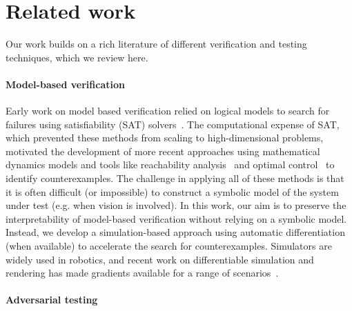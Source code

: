 \section{Related work}

Our work builds on a rich literature of different verification and testing techniques, which we review here.

\paragraph{Model-based verification}

Early work on model based verification relied on logical models to search for failures using satisfiability (SAT) solvers~\cite{dekleerDiagnosingMultipleFaults1987,benardRemoteAgentExperiment2000}. The computational expense of SAT, which prevented these methods from scaling to high-dimensional problems, motivated the development of more recent approaches using mathematical dynamics models and tools like reachability analysis~\cite{annpureddySTaLiRoToolTemporal2011} and optimal control~\cite{chouUsingControlSynthesis2018} to identify counterexamples. The challenge in applying all of these methods is that it is often difficult (or impossible) to construct a symbolic model of the system under test (e.g. when vision is involved). In this work, our aim is to preserve the interpretability of model-based verification without relying on a symbolic model. Instead, we develop a simulation-based approach using automatic differentiation (when available) to accelerate the search for counterexamples. Simulators are widely used in robotics, and recent work on differentiable simulation and rendering has made gradients available for a range of scenarios~\cite{amosOptNetDifferentiableOptimization2017,belubute_peres_lcp_physics,Jakob2020DrJit,jainAnalyzingImprovingNeural2020,huDiffTaichiDifferentiableProgramming2019,zhongGuidedConditionalDiffusion2022,dawsonCertifiableRobotDesign2022,dawsonRobustCounterexampleguidedOptimization2022b}.

\paragraph{Adversarial testing}

